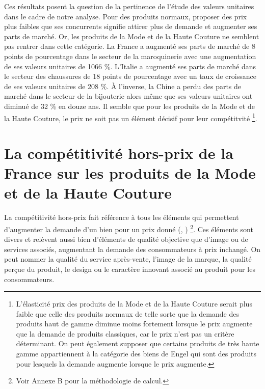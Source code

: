\documentclass[french,10pt,a4paper]{article}
\begin{document}
Ces résultats posent la question de la pertinence de l'étude des valeurs unitaires dans le cadre de notre analyse. Pour des produits \og normaux\fg{}, proposer des prix plus faibles que ses concurrents signifie attirer plus de demande et augmenter ses parts de marché. Or, les produits de la Mode et de la Haute Couture ne semblent pas rentrer dans cette catégorie. La France a augmenté ses parts de marché de 8 points de pourcentage dans le secteur de la maroquinerie avec une augmentation de ses valeurs unitaires de 1066 \%. L'Italie a augmenté ses parts de marché dans le secteur des chaussures de 18 points de pourcentage avec un taux de croissance de ses valeurs unitaires de 208 \%. À l'inverse, la Chine a perdu des parts de marché dans le secteur de la bijouterie alors même que ses valeurs unitaires ont diminué de 32 \% en douze ans. Il semble que pour les produits de la Mode et de la Haute Couture, le prix ne soit pas un élément décisif pour leur compétitvité \footnote{L'élasticité prix des produits de la Mode et de la Haute Couture serait plus faible que celle des produits \og normaux\fg{} de telle sorte que la demande des produits haut de gamme diminue moins fortement lorsque le prix augmente que la demande de produits classiques, car le prix n'est pas un critère déterminant. On peut également supposer que certains produits de très haute gamme appartiennent à la catégorie des biens de \og Engel\fg{} qui sont des produits pour lesquels la demande augmente lorsque le prix augmente.}.



\newpage
{}
\section{La compétitivité hors-prix de la France sur les produits de la Mode et de la Haute Couture}

La compétitivité hors-prix fait référence à tous les éléments qui permettent d'augmenter la demande d'un bien pour un prix donné (\cite{Khandelwal2013}, \cite{Bas2015}) \footnote{Voir Annexe B pour la méthodologie de calcul.}. Ces éléments sont divers et relèvent aussi bien d'éléments de qualité objective que d'image ou de services associés, augmentant la demande des consommateurs à prix inchangé. On peut nommer la qualité du service après-vente, l'image de la marque, la qualité perçue du produit, le design ou le caractère innovant associé au produit pour les consommateurs.
\end{document}
